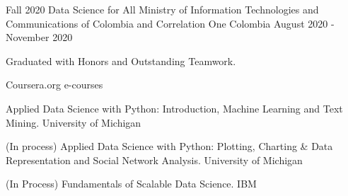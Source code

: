

\begin{cventries}

  \cventry
    {Fall 2020 Data Science for All} %
    {Ministry of Information Technologies and Communications of Colombia and Correlation One } %
    {Colombia} %
    {August 2020 - November 2020} %
    {\begin{cvitems} %
        \item {Graduated with Honors and Outstanding Teamwork. }
      \end{cvitems}}
  \cventry
    {Coursera.org} %
    {e-courses} %
    {} %
    {} %
    {
      \begin{cvitems} %
        \item {Applied Data Science with Python: Introduction, Machine Learning and Text Mining. University of Michigan}
          \item {(In process) Applied Data Science with Python: Plotting, Charting \& Data Representation and Social Network Analysis. University of Michigan}
        \item {(In Process) Fundamentals of Scalable Data Science. IBM}
      \end{cvitems}
    }
\end{cventries}
